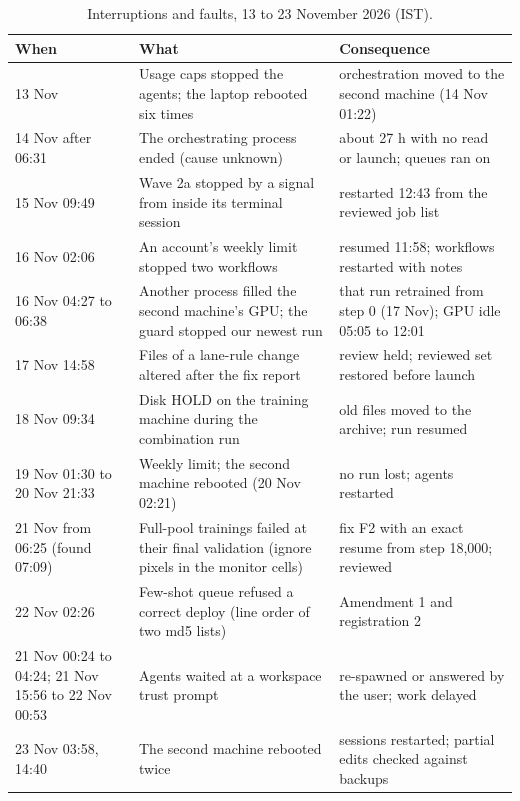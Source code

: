 \begin{table}[htbp]
\centering
\small
\caption{Interruptions and faults, 13 to 23 November 2026 (IST).}
\label{tab:build-incidents}
\begin{tabular}{@{}p{2.6cm}p{6.0cm}p{5.4cm}@{}}
\toprule
When & What & Consequence \\
\midrule
13 Nov & Usage caps stopped the agents; the laptop rebooted six times & orchestration moved to the second machine (14 Nov 01:22) \\
14 Nov after 06:31 & The orchestrating process ended (cause unknown) & about 27 h with no read or launch; queues ran on \\
15 Nov 09:49 & Wave 2a stopped by a signal from inside its terminal session & restarted 12:43 from the reviewed job list \\
16 Nov 02:06 & An account's weekly limit stopped two workflows & resumed 11:58; workflows restarted with notes \\
16 Nov 04:27 to 06:38 & Another process filled the second machine's GPU; the guard stopped our newest run & that run retrained from
step 0 (17 Nov); GPU idle 05:05 to 12:01 \\
17 Nov 14:58 & Files of a lane-rule change altered after the fix report & review held; reviewed set restored before launch \\
18 Nov 09:34 & Disk HOLD on the training machine during the combination run & old files moved to the archive; run resumed \\
19 Nov 01:30 to 20 Nov 21:33 & Weekly limit; the second machine rebooted (20 Nov 02:21) & no run lost; agents restarted \\
21 Nov from 06:25 (found 07:09) & Full-pool trainings failed at their final validation (ignore pixels in the monitor cells) & fix F2 with an exact resume
from step 18,000; reviewed \\
22 Nov 02:26 & Few-shot queue refused a correct deploy (line order of two md5 lists) & Amendment 1 and registration 2 \\
21 Nov 00:24 to 04:24; 21 Nov 15:56 to 22 Nov 00:53 & Agents waited at a workspace trust prompt & re-spawned or answered by
the user; work delayed \\
23 Nov 03:58, 14:40 & The second machine rebooted twice & sessions restarted; partial edits checked against backups \\
\bottomrule
\end{tabular}
\end{table}
